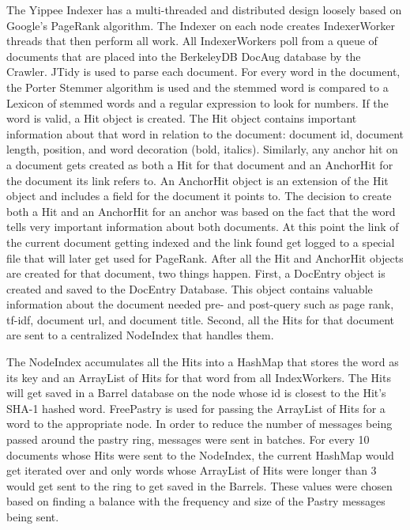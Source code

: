 \documentclass[11pt, letterpaper, oneside, twocolumn]{article}
\begin{document}
The Yippee Indexer has a multi-threaded and distributed design loosely based on Google's  PageRank algorithm\cite{pagerank}. 
The Indexer on each node creates IndexerWorker threads that then perform all work. 
All IndexerWorkers poll from a queue of documents that are placed into the BerkeleyDB DocAug database by the Crawler. 
JTidy is used to parse each document. 
For every word in the document, the Porter Stemmer algorithm is used and the stemmed word is compared to a Lexicon of stemmed words and a regular expression to look for numbers. 
If the word is valid, a Hit object is created. 
The Hit object contains important information about that word in relation to the document: document id, document length, position, and word decoration (bold, italics). 
Similarly, any anchor hit on a document gets created as both a Hit for that document and an AnchorHit for the document its link refers to. 
An AnchorHit object is an extension of the Hit object and includes a field for the document it points to. 
The decision to create both a Hit and an AnchorHit for an anchor was based on the fact that the word tells very important information about both documents. 
At this point the link of the current document getting indexed and the link found get logged to a special file that will later get used for PageRank. 
After all the Hit and AnchorHit objects are created for that document, two things happen. 
First, a DocEntry object is created and saved to the DocEntry Database. 
This object contains valuable information about the document needed pre- and post-query such as page rank, tf-idf, document url, and document title. 
Second, all the Hits for that document are sent to a centralized NodeIndex that handles them.


The NodeIndex accumulates all the Hits into a HashMap that stores the word as its key and an ArrayList of Hits for that word from all IndexWorkers. 
The Hits will get saved in a Barrel database on the node whose id is closest to the Hit's SHA-1 hashed word. 
FreePastry is used for passing the ArrayList of Hits for a word to the appropriate node. 
In order to reduce the number of messages being passed around the pastry ring, messages were sent in batches. 
For every 10 documents whose Hits were sent to the NodeIndex, the current HashMap would get iterated over and only words whose ArrayList of Hits were longer than 3 would get sent to the ring to get saved in the Barrels. 
These values were chosen based on finding a balance with the frequency and size of the Pastry messages being sent. 
\end{document}
